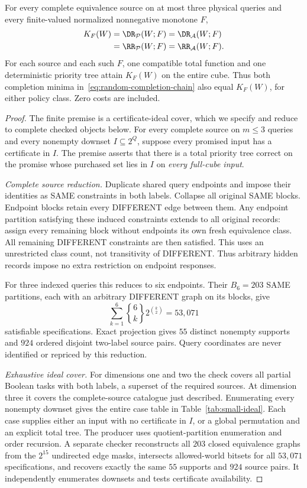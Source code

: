 \begin{theorem}\label{thm:random-small}
For every complete equivalence source on at most three physical queries and every finite-valued normalized nonnegative monotone $F$,
\begin{align*}
 K_F(W)&=\DR_{\mathcal P}(W;F)=\DR_{\mathcal A}(W;F)\\
       &=\RR_{\mathcal P}(W;F)=\RR_{\mathcal A}(W;F).
\end{align*}
For each source and each such $F$, one compatible total function and one deterministic priority tree attain $K_F(W)$ on the entire cube. Thus both completion minima in~\eqref{eq:random-completion-chain} also equal $K_F(W)$, for either policy class. Zero costs are included.
\end{theorem}
\begin{proof}
The finite premise is a certificate-ideal cover, which we specify and reduce to complete checked objects below. For every complete source on $m\leq3$ queries and every nonempty downset $I\subseteq2^Q$, suppose every promised input has a certificate in $I$. The premise asserts that there is a total priority tree correct on the promise whose purchased set lies in $I$ on \emph{every full-cube input}.

\emph{Complete source reduction.} Duplicate shared query endpoints and impose their identities as SAME constraints in both labels. Collapse all original SAME blocks. Endpoint blocks retain every DIFFERENT edge between them. Any endpoint partition satisfying these induced constraints extends to all original records: assign every remaining block without endpoints its own fresh equivalence class. All remaining DIFFERENT constraints are then satisfied. This uses an unrestricted class count, not transitivity of DIFFERENT. Thus arbitrary hidden records impose no extra restriction on endpoint responses.

For three indexed queries this reduces to six endpoints. Their $B_6=203$ SAME partitions, each with an arbitrary DIFFERENT graph on its blocks, give
\[
 \sum_{k=1}^{6}{6\brace k}2^{\binom{k}{2}}=53{,}071
\]
satisfiable specifications. Exact projection gives $55$ distinct nonempty supports and $924$ ordered disjoint two-label source pairs. Query coordinates are never identified or repriced by this reduction.

\emph{Exhaustive ideal cover.} For dimensions one and two the check covers all partial Boolean tasks with both labels, a superset of the required sources. At dimension three it covers the complete-source catalogue just described. Enumerating every nonempty downset gives the entire case table in Table~\ref{tab:small-ideal}. Each case supplies either an input with no certificate in $I$, or a global permutation and an explicit total tree. The producer uses quotient-partition enumeration and order recursion. A separate checker reconstructs all $203$ closed equivalence graphs from the $2^{15}$ undirected edge masks, intersects allowed-world bitsets for all $53{,}071$ specifications, and recovers exactly the same $55$ supports and $924$ source pairs. It independently enumerates downsets and tests certificate availability.


\end{proof}
